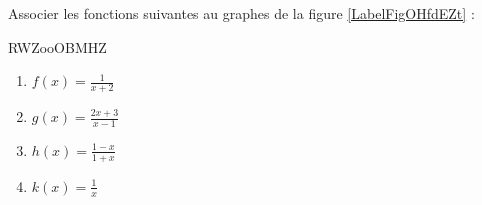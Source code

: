 
\begin{exercice}\label{exosmath-0334}

    Associer les fonctions suivantes au graphes de la figure \ref{LabelFigOHfdEZt} :

RWZooOBMHZ

    \newcommand{\CaptionFigOHfdEZt}{Les graphes de l'exercice \ref{exosmath-0334}.}


\begin{multicols}{2}
    \begin{enumerate}
        \item
            \( f(x)=\frac{1}{ x+2 }\)
        \item
            \( g(x)=\frac{ 2x+3 }{ x-1 }\)
        \item
            \( h(x)=\frac{ 1-x }{ 1+x }\)
        \item
            \( k(x)=\frac{ 1 }{ x }\)
    \end{enumerate}
\end{multicols}

\end{exercice}
